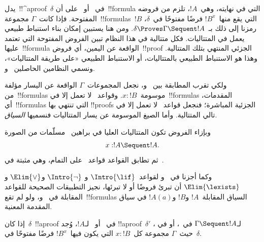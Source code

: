 \documentclass[../../../include/open-logic-section]{subfiles}
\begin{document}


يدل~!!^a{proof}~$\delta$ في~ أو~ على أن~!!{formula}
التي في نهايته، وهي~$!A$، تلزم من فروضه المفتوحة. فإذا كانت~$\Gamma$
مجموعة~!!{formula}s~$!B$ التي يقع منها~$!B^x$ فرضًا مفتوحًا في~$\delta$،
رمزنا إلى ذلك بـ~$\delta \Proves \Gamma \Sequent !A$. ومن هنا يستبين
إمكان بناء استنباط طبيعي يعمل في المتتاليات. فكل متتالية في هذا النظام
تبين الفروض المفتوحة التي تعتمد عليها~!!{formula} الواقعة عن اليمين،
أي فروض~!!{proof} الجزئي المنتهي بتلك المتتالية. وهذا هو الاستنباط
الطبيعي بالمتتاليات، أو الاستنباط الطبيعي «على طريقة المتتاليات»،
ونسمي النظامين الحاصلين~ و.

ولكي تقرب المطابقة بين~ و، نجعل المجموعات~$\Gamma$
الواقعة عن اليسار مؤلفة من~!!{formula}s موسومة~$x:!B$. وقواعد~
لا تعمل إلا في~!!{formula}s المقدمات، أي~!!{formula}s التي تنتهي بها
!!{proof}s الجزئية المباشرة؛ فنجعل قواعد~ لا تعمل إلا في تالي
المتتالية. وأما الصيغ الموسومة عن يسار المتتاليات فنسميها
\emph{السياق}.

وبإزاء الفروض تكون المتتاليات العليا في براهين~ مسلّمات من الصورة
\[x:!A \Sequent !A.\]
ثم تطابق القواعد قواعد~ على التمام، وهي مثبتة في~.



وكما أجزنا في~ و لقواعد~$\Intro{\lif}$ و
$\Intro{\lnot}$ و$\Elim{\lor}$ و$\Elim{\lexists}$ أن تبرئ فروضًا أو
لا تبرئها، نجيز التطبيقات الصحيحة للقواعد المقابلة في~
و، ولو لم تقع~!!{formula}s السياق المقابلة~$!A$ و$!B$
و$!A(a)$ في سياق المقدمة المعنية.

\begin{prop}
إذا كان~$\delta$~!!a{proof} في~ أو~ لـ$!A$، وُجد
!!a{proof}~$\delta'$ لـ$\Gamma \Sequent !A$ في~، أو في
، حيث~$\Gamma$ مجموعة كل~$x:!B$ التي يكون فيها~$!B^x$ فرضًا
مفتوحًا في~$\delta$.
\end{prop}
\end{document}
